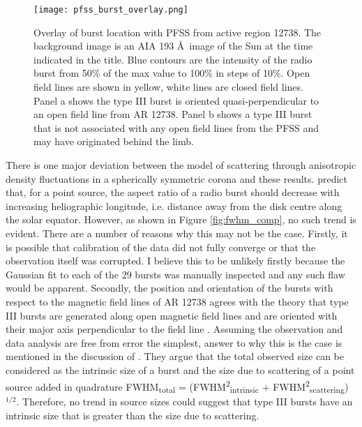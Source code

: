\begin{figure}[ht]
\centering
\texttt{[image: pfss\_burst\_overlay.png]}
\caption[Overlay of burst location with PFSS from active region 12738.]{Overlay of burst location with PFSS from active region 12738. The background image is an AIA 193 \AA \ image of the Sun at the time indicated in the title. Blue contours are the intensity of the radio burst from 50\% of the max value to 100\% in steps of 10\%. Open field lines are shown in yellow, white lines are closed field lines. Panel a shows the type III burst is oriented quasi-perpendicular to an open field line from AR 12738. Panel b shows a type III burst that is not associated with any open field lines from the PFSS and may have originated behind the limb.}
\label{fig:pfss_overlay}
\end{figure}

There is one major deviation between the model of scattering through anisotropic density fluctuations in a spherically symmetric corona and these results. \cite{Kontar2019} predict that, for a point source, the aspect ratio of a radio burst should decrease with increasing heliographic longitude, i.e. distance away from the disk centre along the solar equator. However, as shown in Figure \ref{fig:fwhm_comp}, no such trend is evident.  
There are a number of reasons why this may not be the case. Firstly, it is possible that calibration of the data did not fully converge or that the observation itself was corrupted. I believe this to be unlikely firstly because the Gaussian fit to each of the 29 bursts was manually inspected and any such flaw would be apparent. Secondly, the position and orientation of the bursts with respect to the magnetic field lines of AR 12738 agrees with the theory that type III bursts are generated along open magnetic field lines \citep{Wild1950a, Wild1950d} and are oriented with their major axis perpendicular to the field line \citep{SasikumarRaja2016}. 
Assuming the observation and data analysis are free from error the simplest, answer to why this is the case is mentioned in the discussion of \cite{Kontar2019}. They argue that the total observed size can be considered as the intrinsic size of a burst and the size due to scattering of a point source added in quadrature FWHM\textsubscript{total} = (FWHM\textsuperscript{2}\textsubscript{intrinsic} + FWHM\textsuperscript{2}\textsubscript{scattering})$^{1/2}$. Therefore, no trend in source sizes could suggest that type III bursts have an intrinsic size that is greater than the size due to scattering. 

